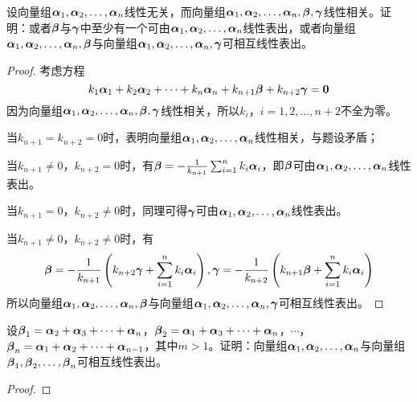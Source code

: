 \begin{problem}\label{problem-2.32}
设向量组\(\enums{\vecal}{n}\)线性无关，而向量组\(\enums{\vecal}{n},\vecbeta,\vecgamma\)线性相关。证明：或者\(\vecbeta\)与\(\vecgamma\)中至少有一个可由\(\enums{\vecal}{n}\)线性表出，或者向量组\(\enums{\vecal}{n},\vecbeta\)与向量组\(\enums{\vecal}{n},\vecgamma\)可相互线性表出。
\end{problem}
\begin{proof}
    考虑方程
    \begin{equation*}
        k_{1}\vecal_{1}+k_{2}\vecal_{2}+\cdots+k_{n}\vecal_{n}+k_{n+1}\vecbeta+k_{n+2}\vecgamma=\veczero
    \end{equation*}
    因为向量组\(\enums{\vecal}{n},\vecbeta,\vecgamma\)线性相关，所以\(k_i\)，\(i=1,2,\dots,n+2\)不全为零。

    当\(k_{n+1}=k_{n+2}=0\)时，表明向量组\(\enums{\vecal}{n}\)线性相关，与题设矛盾；

    当\(k_{n+1}\neq0\)，\(k_{n+2}=0\)时，有\(\vecbeta=-\frac{1}{k_{n+1}}\sum_{i=1}^{n}k_i\vecal_i\)，即\(\vecbeta\)可由\(\enums{\vecal}{n}\)线性表出。

    当\(k_{n+1}=0\)，\(k_{n+2}\neq0\)时，同理可得\(\vecgamma\)可由\(\enums{\vecal}{n}\)线性表出。

    当\(k_{n+1}\neq0\)，\(k_{n+2}\neq0\)时，有
    \begin{equation*}
        \vecbeta=-\frac{1}{k_{n+1}}\spar{k_{n+2}\vecgamma+\sum_{i=1}^{n}k_i\vecal_i},\vecgamma=-\frac{1}{k_{n+2}}\spar{k_{n+1}\vecbeta+\sum_{i=1}^{n}k_i\vecal_i}
    \end{equation*}
    所以向量组\(\enums{\vecal}{n},\vecbeta\)与向量组\(\enums{\vecal}{n},\vecgamma\)可相互线性表出。
\end{proof}

\begin{problem}\label{problem-2.33}
设\(\vecbeta_1=\vecal_2+\vecal_3+\cdots+\vecal_{n}\)，\(\vecbeta_2=\vecal_1+\vecal_3+\cdots+\vecal_{n}\)，\(\cdots\)，\(\vecbeta_n=\vecal_1+\vecal_2+\cdots+\vecal_{n-1}\)，其中\(m>1\)。证明：向量组\(\enums{\vecal}{n}\)与向量组\(\enums{\vecbeta}{n}\)可相互线性表出。
\end{problem}
\begin{proof}
\end{proof}

